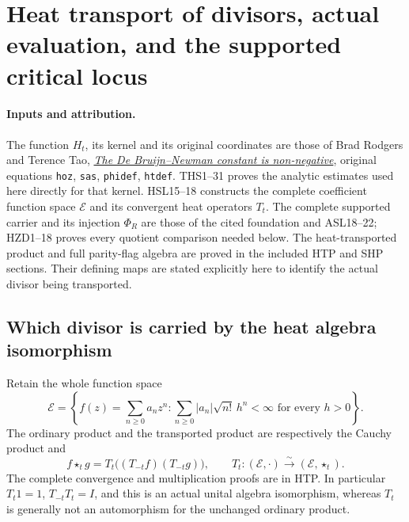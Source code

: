 \section{Heat transport of divisors, actual evaluation, and the supported critical locus}
\label{sec:heat-divisor-transport}

\paragraph{Inputs and attribution.}
The function $H_t$, its kernel and its original coordinates are those
of Brad Rodgers and Terence Tao,
\href{https://arxiv.org/abs/1801.05914v5}{\emph{The De Bruijn--Newman
constant is non-negative}}, original equations \texttt{hoz},
\texttt{sas}, \texttt{phidef}, \texttt{htdef}. THS1--31 proves the
analytic estimates used here directly for that kernel. HSL15--18
constructs the complete coefficient function space $\mathcal E$ and
its convergent heat operators $T_t$. The complete supported carrier
and its injection $\Phi_R$ are those of the cited foundation and
ASL18--22; HZD1--18 proves every quotient comparison needed below.
The heat-transported product and full parity-flag algebra are proved
in the included HTP and SHP sections. Their defining maps are stated
explicitly here to identify the actual divisor being transported.

\subsection{Which divisor is carried by the heat algebra isomorphism}

Retain the whole function space
\begin{equation}\tag{HDT1}
 \mathcal E=\left\{f(z)=\sum_{n\ge0}a_nz^n:
       \sum_{n\ge0}|a_n|\sqrt{n!}\,h^n<\infty
                         \text{ for every }h>0\right\}.
\end{equation}
The ordinary product and the transported product are respectively
the Cauchy product and
\begin{equation}\tag{HDT2}
 f\star_t g=T_t\bigl((T_{-t}f)(T_{-t}g)\bigr),\qquad
 T_t:(\mathcal E,\cdot)\xrightarrow{\sim}(\mathcal E,\star_t).
\end{equation}
The complete convergence and multiplication proofs are in HTP.
In particular $T_t1=1$, $T_{-t}T_t=I$, and this is an actual
unital algebra isomorphism, whereas $T_t$ is generally not an
automorphism for the unchanged ordinary product.

